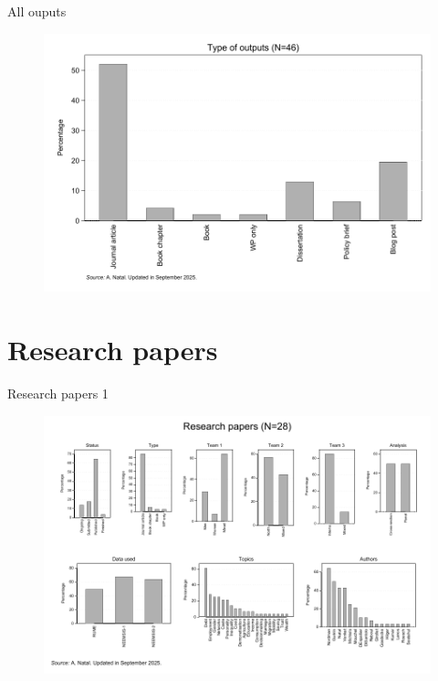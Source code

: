 \documentclass[aspectratio=169]{beamer}
\begin{document}
\begin{frame}{All ouputs}

\begin{figure}[h]
\centering
\includegraphics[width=0.7\columnwidth]{INPUT/A_type}
\end{figure}

\end{frame}






\section*{Research papers}
\begin{frame}
\label{research}


\end{frame}





\begin{frame}{Research papers 1}

\begin{figure}[h]
\centering
\includegraphics[width=0.7\columnwidth]{INPUT/RP_global}
\end{figure}

\end{frame}
\end{document}
